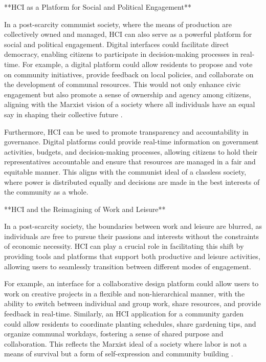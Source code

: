 **HCI as a Platform for Social and Political Engagement**

In a post-scarcity communist society, where the means of production are collectively owned and managed, HCI can also serve as a powerful platform for social and political engagement. Digital interfaces could facilitate direct democracy, enabling citizens to participate in decision-making processes in real-time. For example, a digital platform could allow residents to propose and vote on community initiatives, provide feedback on local policies, and collaborate on the development of communal resources. This would not only enhance civic engagement but also promote a sense of ownership and agency among citizens, aligning with the Marxist vision of a society where all individuals have an equal say in shaping their collective future \cite[pp.~85-87]{bookchin1991}.

Furthermore, HCI can be used to promote transparency and accountability in governance. Digital platforms could provide real-time information on government activities, budgets, and decision-making processes, allowing citizens to hold their representatives accountable and ensure that resources are managed in a fair and equitable manner. This aligns with the communist ideal of a classless society, where power is distributed equally and decisions are made in the best interests of the community as a whole.

**HCI and the Reimagining of Work and Leisure**

In a post-scarcity society, the boundaries between work and leisure are blurred, as individuals are free to pursue their passions and interests without the constraints of economic necessity. HCI can play a crucial role in facilitating this shift by providing tools and platforms that support both productive and leisure activities, allowing users to seamlessly transition between different modes of engagement.

For example, an interface for a collaborative design platform could allow users to work on creative projects in a flexible and non-hierarchical manner, with the ability to switch between individual and group work, share resources, and provide feedback in real-time. Similarly, an HCI application for a community garden could allow residents to coordinate planting schedules, share gardening tips, and organize communal workdays, fostering a sense of shared purpose and collaboration. This reflects the Marxist ideal of a society where labor is not a means of survival but a form of self-expression and community building \cite[pp.~67-69]{debord1967}.

